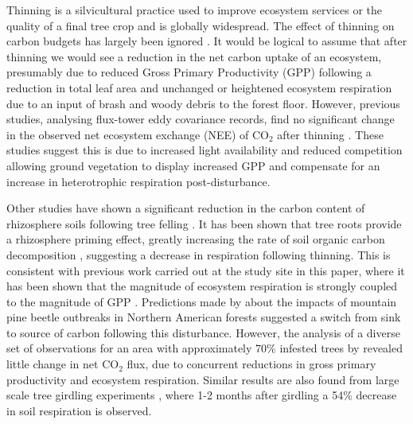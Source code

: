 \documentclass[draft,linenumbers]{agujournal}
\begin{document}
Thinning is a silvicultural practice used to improve ecosystem services or the quality of a final tree crop and is globally widespread. The effect of thinning on carbon budgets has largely been ignored \citep{JGRG:JGRG779}. It would be logical to assume that after thinning we would see a reduction in the net carbon uptake of an ecosystem, presumably due to reduced Gross Primary Productivity (GPP) following a reduction in total leaf area and unchanged or heightened ecosystem respiration due to an input of brash and woody debris to the forest floor. However, previous studies, analysing flux-tower eddy covariance records, find no significant change in the observed net ecosystem exchange (NEE) of CO\(_{2}\) after thinning \citep{vesala2005effect, wilkinson2015effects, moreaux2011paired, dore2012recovery}. These studies suggest this is due to increased light availability and reduced competition allowing ground vegetation to display increased GPP and compensate for an increase in heterotrophic respiration post-disturbance.  

Other studies have shown a significant reduction in the carbon content of rhizosphere soils following tree felling \citep{Hernesmaa2005777}. It has been shown that tree roots provide a rhizosphere priming effect, greatly increasing the rate of soil organic carbon decomposition \citep{ELE:ELE1095}, suggesting a decrease in respiration following thinning. This is consistent with previous work carried out at the study site in this paper, where it has been shown that the magnitude of ecosystem respiration is strongly coupled to the magnitude of GPP \citep{heinemeyer2012exploring}. Predictions made by \citet{kurz2008mountain} about the impacts of mountain pine beetle outbreaks in Northern American forests suggested a switch from sink to source of carbon following this disturbance. However, the analysis of a diverse set of observations for an area with approximately 70\% infested trees by \citet{ELE:ELE12097} revealed little change in net CO\(_{2}\) flux, due to concurrent reductions in gross primary productivity and ecosystem respiration. Similar results are also found from large scale tree girdling experiments \citep{hogberg2001large},  where 1-2 months after girdling a 54\% decrease in soil respiration is observed.
\end{document}
